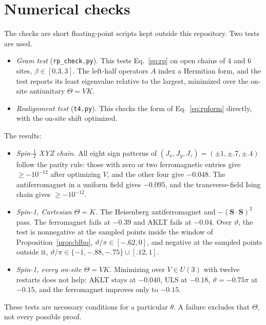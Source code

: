 \documentclass[aps,prl,reprint,amsmath,amssymb,nofootinbib,raggedbottom]{revtex4-2}
\begin{document}
\section{Numerical checks}\label{app:checks}
The checks are short floating-point scripts kept outside this repository. Two tests are used.
\begin{itemize}
\item \emph{Gram test} (\texttt{rp\_check.py}). This tests
Eq.~\eqref{eq:rp} on open chains of $4$ and $6$ sites,
$\beta\in[0.3,3]$. The left-half operators $A$ index a Hermitian form, and
the test reports its least eigenvalue relative to the largest, minimized over
the on-site antiunitary $\Theta=VK$.
\item \emph{Realignment test} (\texttt{t4.py}). This checks the form of
Eq.~\eqref{eq:rpform} directly, with the on-site shift optimized.
\end{itemize}
The results:
\begin{itemize}
\item \emph{Spin-$\tfrac12$ XYZ chain.} All eight sign patterns of
$(J_x,J_y,J_z)=(\pm1,\pm.7,\pm.4)$ follow the parity rule: those with zero
or two ferromagnetic entries give $\ge-10^{-12}$ after optimizing $V$, and
the other four give $-0.048$. The antiferromagnet in a uniform field gives
$-0.095$, and the transverse-field Ising chain gives $\ge-10^{-12}$.
\item \emph{Spin-1, Cartesian $\Theta=K$.} The Heisenberg antiferromagnet
and $-(\bm S\cdot\bm S)^2$ pass. The ferromagnet fails at $-0.39$ and AKLT
fails at $-0.04$. Over $\vartheta$, the test is nonnegative at the sampled points inside the
window of Proposition~\ref{prop:blbq}, $\vartheta/\pi\in[-.62,0]$, and negative at the sampled points
outside it, $\vartheta/\pi\in\{-1,-.88,-.75\}\cup[.12,1]$.
\item \emph{Spin-1, every on-site $\Theta=VK$.} Minimizing over $V\in U(3)$
with twelve restarts does not help: AKLT stays at $-0.040$, ULS at $-0.18$,
$\vartheta=-0.75\pi$ at $-0.15$, and the ferromagnet improves only to $-0.15$.
\end{itemize}
These tests are necessary conditions for a particular $\theta$. A failure
excludes that $\Theta$, not every possible proof.
\end{document}

